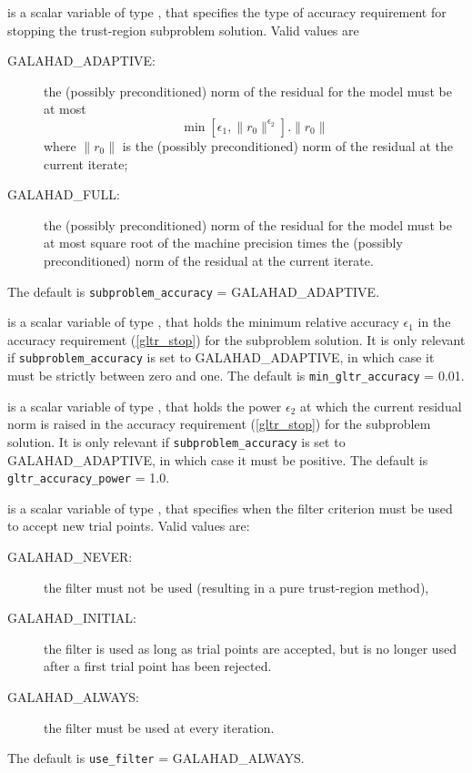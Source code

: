 \documentclass{galahad}
\newcommand{\sym}{\sf\small}
\begin{document}
\begin{description}
 is a scalar variable of type \integer,
that specifies the type of accuracy requirement for stopping the trust-region
subproblem solution. Valid values are
\begin{description}
\item[\sym GALAHAD\_ADAPTIVE:] the (possibly preconditioned) norm of the
residual for the model must be at most 
\begin{equation}\label{gltr_stop}
\min\left[\epsilon_1,\| r_0 \|^{\epsilon_2}\right] . \|r_0\|
\end{equation}
where $\|r_0\|$ is the (possibly preconditioned) norm of the residual at the
current iterate; 
\item[\sym GALAHAD\_FULL:] the (possibly preconditioned) norm of the residual
for the model must be at most square root of the machine precision times
the (possibly preconditioned) norm of the residual at the current iterate.
\end{description}
The default is {\tt subproblem\_accuracy} = {\sym GALAHAD\_ADAPTIVE}.

 is a scalar variable of type \realdp, that
holds the minimum relative accuracy $\epsilon_1$ in the accuracy
requirement (\ref{gltr_stop}) for the subproblem solution.
It is only relevant if {\tt subproblem\_accuracy} is set
to {\sym GALAHAD\_ADAPTIVE}, in which case it must be strictly between zero
and one. 
The default is {\tt min\_gltr\_accuracy} = 0.01.

 is a scalar variable of type \realdp, that
holds the power $\epsilon_2$ at which the current residual norm is raised in
the accuracy requirement (\ref{gltr_stop}) for the subproblem solution. 
It is only relevant if {\tt subproblem\_accuracy} is set
to {\sym GALAHAD\_ADAPTIVE}, in which case it must be positive.
The default is {\tt gltr\_accuracy\_power} = 1.0.

 is a scalar variable of type \integer, that
specifies when the filter criterion must be used to accept new trial points.
Valid values are:
\begin{description}
\item[\sym GALAHAD\_NEVER:] the filter must not be used (resulting in a pure
trust-region method),
\item[\sym GALAHAD\_INITIAL:] the filter is used as long as trial points are
accepted, but is no longer used after a first trial point has been rejected.
\item[\sym GALAHAD\_ALWAYS:] the filter must be used at every iteration.
\end{description}
The default is {\tt use\_filter} = {\sym GALAHAD\_ALWAYS}.


\end{description}
\end{document}
